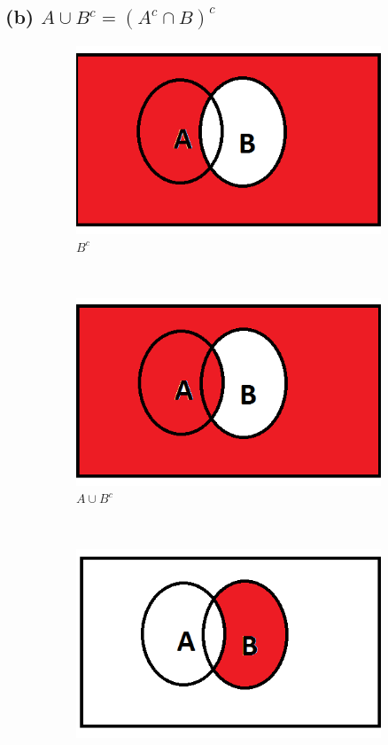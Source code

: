 \documentclass[a4paper,11pt]{article}
\begin{document}
\subsection*{(b) $A \cup B^c = (A^c\cap B)^c$}
\begin{figure}[hb]
  \centering
    \begin{subfigure}[b]{0.25\textwidth}
        \includegraphics[width=\textwidth]{BC}
        \caption{$B^c$}
    \end{subfigure}
 ~
    \begin{subfigure}[b]{0.25\textwidth}
        \includegraphics[width=\textwidth]{AuBc}
        \caption{$A \cup B^c$}
    \end{subfigure}
 ~
    \begin{subfigure}[b]{0.25\textwidth}
        \includegraphics[width=\textwidth]{AcnB}

\end{subfigure}
\end{figure}
\end{document}
